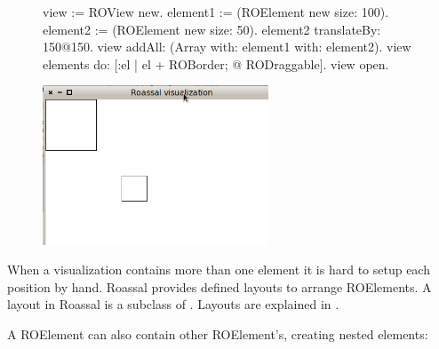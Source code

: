 \documentclass[a4paper,10pt,twoside]{book}
\begin{document}
\begin{figure}[H]
      \begin{minipage}[t]{0.5\textwidth}
      \vspace{0pt}
\begin{code}{}
view := ROView new.
element1 := (ROElement new size: 100).
element2 := (ROElement new size: 50).
element2 translateBy: 150@150.
view addAll: (Array with: element1 with: element2).
view elements do: [:el | el + ROBorder; @ RODraggable].
view open.
\end{code}
   \end{minipage}
   \hfill
   \begin{minipage}[t]{0.6\textwidth}
      \vspace{0pt} \raggedright
       \centering
		\includegraphics[width=0.6\textwidth]{ex4}
   \end{minipage}
\label{fig:ex4}
\end{figure}


When a visualization contains more than one element it is hard to setup each position by hand. Roassal provides defined layouts to arrange ROElements. A layout in Roassal is a subclass of . Layouts are explained in  .

A ROElement can also contain other ROElement's, creating nested elements:
\end{document}
